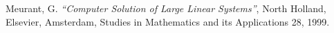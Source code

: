 \begin{thebibliography}{99}
 Meurant, G.
{\em ``Computer Solution of Large Linear Systems''},
North Holland, Elsevier, Amsterdam, Studies in Mathematics and its Applications 28, 1999.

\end{thebibliography}

